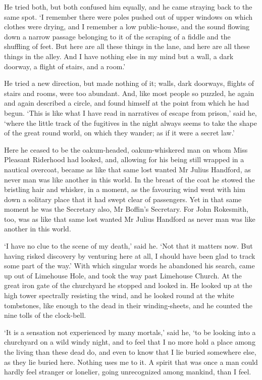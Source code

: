 He tried both, but both confused him equally, and he came straying
back to the same spot. ‘I remember there were poles pushed out of upper
windows on which clothes were drying, and I remember a low public-house,
and the sound flowing down a narrow passage belonging to it of the
scraping of a fiddle and the shuffling of feet. But here are all these
things in the lane, and here are all these things in the alley. And I
have nothing else in my mind but a wall, a dark doorway, a flight of
stairs, and a room.’

He tried a new direction, but made nothing of it; walls, dark doorways,
flights of stairs and rooms, were too abundant. And, like most people so
puzzled, he again and again described a circle, and found himself at
the point from which he had begun. ‘This is like what I have read in
narratives of escape from prison,’ said he, ‘where the little track of
the fugitives in the night always seems to take the shape of the great
round world, on which they wander; as if it were a secret law.’

Here he ceased to be the oakum-headed, oakum-whiskered man on whom Miss
Pleasant Riderhood had looked, and, allowing for his being still wrapped
in a nautical overcoat, became as like that same lost wanted Mr Julius
Handford, as never man was like another in this world. In the breast of
the coat he stowed the bristling hair and whisker, in a moment, as the
favouring wind went with him down a solitary place that it had swept
clear of passengers. Yet in that same moment he was the Secretary also,
Mr Boffin’s Secretary. For John Rokesmith, too, was as like that same
lost wanted Mr Julius Handford as never man was like another in this
world.

‘I have no clue to the scene of my death,’ said he. ‘Not that it matters
now. But having risked discovery by venturing here at all, I should have
been glad to track some part of the way.’ With which singular words he
abandoned his search, came up out of Limehouse Hole, and took the way
past Limehouse Church. At the great iron gate of the churchyard he
stopped and looked in. He looked up at the high tower spectrally
resisting the wind, and he looked round at the white tombstones, like
enough to the dead in their winding-sheets, and he counted the nine
tolls of the clock-bell.

‘It is a sensation not experienced by many mortals,’ said he, ‘to be
looking into a churchyard on a wild windy night, and to feel that I no
more hold a place among the living than these dead do, and even to know
that I lie buried somewhere else, as they lie buried here. Nothing uses
me to it. A spirit that was once a man could hardly feel stranger or
lonelier, going unrecognized among mankind, than I feel.

